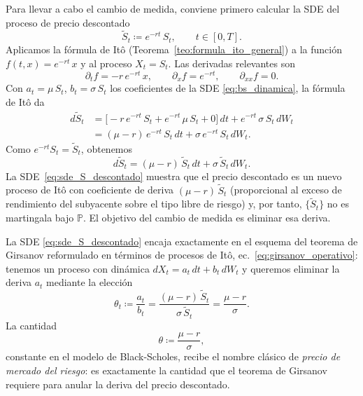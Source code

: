 \documentclass[11pt,a4paper,oneside]{report}
\theoremstyle{plain}
\theoremstyle{definition}
\theoremstyle{remark}
\newcommand{\PP}{\mathbb{P}}
\newcommand{\1}{\mathbf{1}}
\newcommand{\eqdef}{\coloneqq}
\begin{document}
Para llevar a cabo el
cambio de medida, conviene primero calcular la SDE del proceso de
precio descontado
\begin{equation}\label{eq:precio_descontado_def}
  \widetilde S_t \eqdef e^{-rt}\, S_t,
  \qquad t \in [0, T].
\end{equation}
Aplicamos la fórmula de Itô (Teorema~\ref{teo:formula_ito_general}) a
la función $f(t, x) = e^{-rt}\, x$ y al proceso $X_t = S_t$. Las
derivadas relevantes son
\begin{equation*}
  \partial_t f = -r\, e^{-rt}\, x, \qquad
  \partial_x f = e^{-rt}, \qquad
  \partial_{xx} f = 0.
\end{equation*}
Con $a_t = \mu\, S_t$, $b_t = \sigma\, S_t$ los coeficientes de la SDE
\eqref{eq:bs_dinamica}, la fórmula de Itô da
\begin{align*}
  d\widetilde S_t
  &= \bigl[-r\, e^{-rt}\, S_t + e^{-rt}\, \mu\, S_t + 0\bigr]\, dt
   + e^{-rt}\, \sigma\, S_t\, dW_t \\
  &= (\mu - r)\, e^{-rt}\, S_t\, dt + \sigma\, e^{-rt}\, S_t\, dW_t.
\end{align*}
Como $e^{-rt} S_t = \widetilde S_t$, obtenemos
\begin{equation}\label{eq:sde_S_descontado}
  \boxed{\; d\widetilde S_t
        = (\mu - r)\, \widetilde S_t\, dt
        + \sigma\, \widetilde S_t\, dW_t. \;}
\end{equation}
La SDE~\eqref{eq:sde_S_descontado} muestra que el precio descontado es
un nuevo proceso de Itô con coeficiente de deriva $(\mu - r)\,
\widetilde S_t$ (proporcional al exceso de rendimiento del subyacente
sobre el tipo libre de riesgo) y, por tanto, $\{\widetilde S_t\}$ no es
martingala bajo $\PP$. El objetivo del cambio de medida es eliminar esa deriva.

La SDE
\eqref{eq:sde_S_descontado} encaja exactamente en el esquema del teorema de Girsanov reformulado en términos de procesos de Itô,
ec.~\eqref{eq:girsanov_operativo}: tenemos un proceso con dinámica
$dX_t = a_t\, dt + b_t\, dW_t$ y queremos eliminar la deriva $a_t$
mediante la elección
\begin{equation*}
  \theta_t \eqdef \frac{a_t}{b_t}
              = \frac{(\mu - r)\, \widetilde S_t}
                     {\sigma\, \widetilde S_t}
              = \frac{\mu - r}{\sigma}.
\end{equation*}
La cantidad
\begin{equation}\label{eq:precio_riesgo}
  \theta \eqdef \frac{\mu - r}{\sigma},
\end{equation}
constante en el modelo de Black-Scholes, recibe el nombre clásico de
\emph{precio de mercado del riesgo}: es exactamente la cantidad que el
teorema de Girsanov requiere para anular la deriva del precio
descontado.
\end{document}
